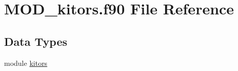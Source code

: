 \hypertarget{MOD__kitors_8f90}{\section{M\-O\-D\-\_\-kitors.\-f90 File Reference}
\label{MOD__kitors_8f90}
}
\subsection*{Data Types}
\begin{DoxyCompactItemize}
\item 
module \hyperlink{classkitors}{kitors}
\end{DoxyCompactItemize}
